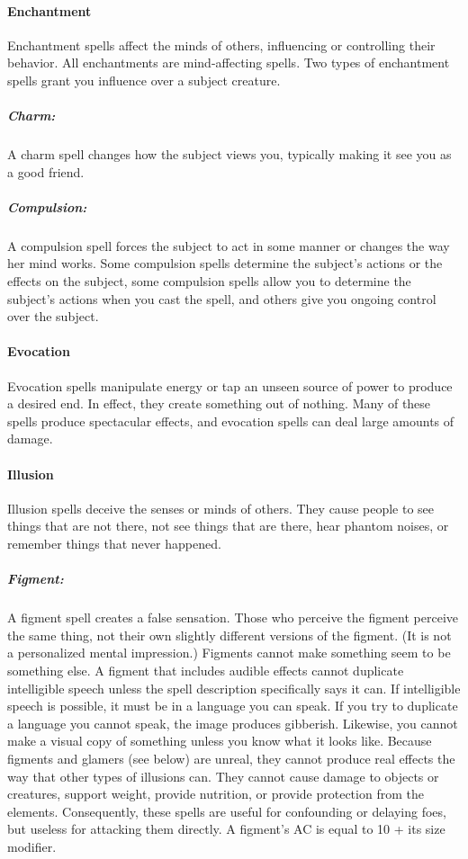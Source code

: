 \documentclass[../VancianToPsionics.tex]{subfiles}
\begin{document}
\paragraph{Enchantment}
Enchantment spells affect the minds of others, influencing or controlling their behavior.
All enchantments are mind-affecting spells. Two types of enchantment spells grant you influence over a subject creature.

\subparagraph{Charm:}
A charm spell changes how the subject views you, typically making it see you as a good friend.

\subparagraph{Compulsion:}
A compulsion spell forces the subject to act in some manner or changes the way her mind works. 
Some compulsion spells determine the subject's actions or the effects on the subject, some compulsion spells allow you to determine the subject's actions when you cast the spell, and others give you ongoing control over the subject.
\paragraph{Evocation}
Evocation spells manipulate energy or tap an unseen source of power to produce a desired end. 
In effect, they create something out of nothing. 
Many of these spells produce spectacular effects, and evocation spells can deal large amounts of damage.
\paragraph{Illusion}
Illusion spells deceive the senses or minds of others. 
They cause people to see things that are not there, not see things that are there, hear phantom noises, or remember things that never happened.

\subparagraph{Figment:}
A figment spell creates a false sensation. Those who perceive the figment perceive the same thing, not their own slightly different versions of the figment. (It is not a personalized mental impression.) 
Figments cannot make something seem to be something else. 
A figment that includes audible effects cannot duplicate intelligible speech unless the spell description specifically says it can. 
If intelligible speech is possible, it must be in a language you can speak. 
If you try to duplicate a language you cannot speak, the image produces gibberish. 
Likewise, you cannot make a visual copy of something unless you know what it looks like.
Because figments and glamers (see below) are unreal, they cannot produce real effects the way that other types of illusions can. 
They cannot cause damage to objects or creatures, support weight, provide nutrition, or provide protection from the elements. 
Consequently, these spells are useful for confounding or delaying foes, but useless for attacking them directly.
A figment's AC is equal to 10 + its size modifier.
\end{document}
